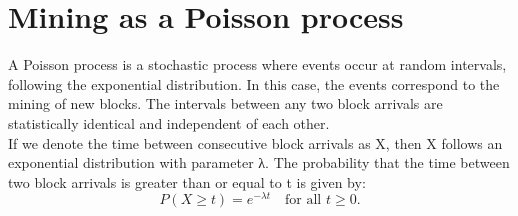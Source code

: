 \section{Mining as a Poisson process}
A Poisson process is a stochastic process where events occur at random intervals, following the exponential distribution. In this case, the events correspond to the mining of new blocks. The intervals between any two block arrivals are statistically identical and independent of each other.\\
If we denote the time between consecutive block arrivals as X, then X follows an exponential distribution with parameter λ. The probability that the time between two block arrivals is greater than or equal to t is given by:\\
$$ P(X \geq t) = e^{-\lambda t} \quad \text{for all } t \geq 0. $$

